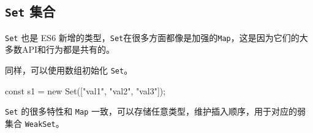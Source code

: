 \subsection{\texttt{Set} 集合}

\texttt{Set} 也是 ES6 新增的类型，\texttt{Set}在很多方面都像是加强的\texttt{Map}，这是因为它们的大多数API和行为都是共有的。

同样，可以使用数组初始化 \texttt{Set}。

\begin{JavaScript}
const s1 = new Set(["val1", "val2", "val3"]);
\end{JavaScript}

\texttt{Set} 的很多特性和 \texttt{Map} 一致，可以存储任意类型，维护插入顺序，用于对应的弱集合 \texttt{WeakSet}。

\newpage